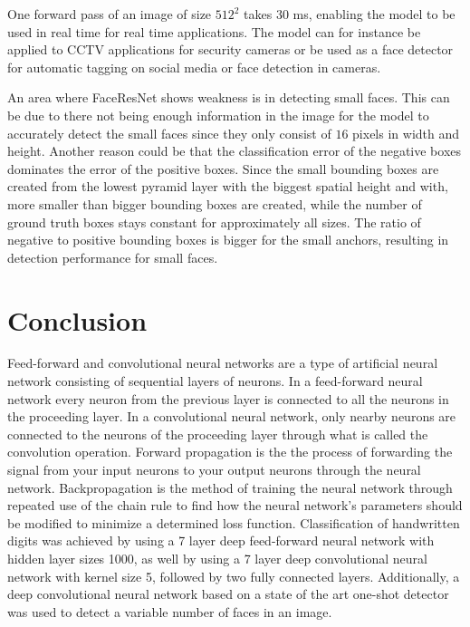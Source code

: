 \documentclass[a4paper, twoside]{article}
\begin{document}
One forward pass of an image of size $512^2$ takes 30 ms, enabling the model to be used in real time for real time applications. The model can for instance be applied to CCTV applications for security cameras or be used as a face detector for automatic tagging on social media or face detection in cameras.

An area where FaceResNet shows weakness is in detecting small faces. This can be due to there not being enough information in the image for the model to accurately detect the small faces since they only consist of $16$ pixels in width and height. Another reason could be that the classification error of the negative boxes dominates the error of the positive boxes. Since the small bounding boxes are created from the lowest pyramid layer with the biggest spatial height and with, more smaller than bigger bounding boxes are created, while the number of ground truth boxes stays constant for approximately all sizes. The ratio of negative to positive bounding boxes is bigger for the small anchors, resulting in detection performance for small faces.

\section{Conclusion} 
Feed-forward and convolutional neural networks are a type of artificial neural network consisting of sequential layers of neurons. In a feed-forward neural network every neuron from the previous layer is connected to all the neurons in the proceeding layer. In a convolutional neural network, only nearby neurons are connected to the neurons of the proceeding layer through what is called the convolution operation. Forward propagation is the the process of forwarding the signal from your input neurons to your output neurons through the neural network. Backpropagation is the method of training the neural network through repeated use of the chain rule to find how the neural network's parameters should be modified to minimize a determined loss function. Classification of handwritten
digits was achieved by using a 7 layer deep feed-forward neural network with hidden layer sizes 1000, as well by using a 7 layer deep convolutional neural network with kernel size 5, followed by two fully connected layers. Additionally, a deep convolutional neural network based on a state of the art one-shot detector was used to detect a variable number of faces in an image.
\end{document}
